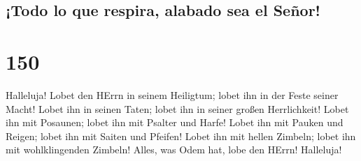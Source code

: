 \hypertarget{todo-lo-que-respira-alabado-sea-el-seuxf1or}{%
\subsection{¡Todo lo que respira, alabado sea el
Señor!}\label{todo-lo-que-respira-alabado-sea-el-seuxf1or}}

\hypertarget{section-149}{%
\section{150}\label{section-149}}

 Halleluja! Lobet den HErrn in seinem Heiligtum; lobet ihn
in der Feste seiner Macht!  Lobet ihn in seinen Taten;
lobet ihn in seiner großen Herrlichkeit!  Lobet ihn mit
Posaunen; lobet ihn mit Psalter und Harfe!  Lobet ihn mit
Pauken und Reigen; lobet ihn mit Saiten und Pfeifen! 
Lobet ihn mit hellen Zimbeln; lobet ihn mit wohlklingenden Zimbeln!
 Alles, was Odem hat, lobe den HErrn! Halleluja!
